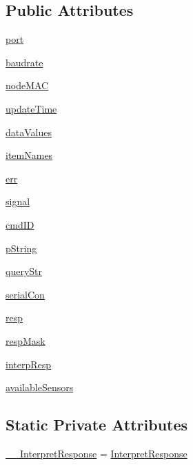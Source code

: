 \subsection*{Public Attributes}
\begin{DoxyCompactItemize}
\item 
\hyperlink{classreadsensor_1_1ReadSensor_aa5479d51839a34226df007973db5b28a}{port}
\item 
\hyperlink{classreadsensor_1_1ReadSensor_a55ad7cd6f26347c571cdc03025d52449}{baudrate}
\item 
\hyperlink{classreadsensor_1_1ReadSensor_aca28301a80b828d13f180b3560acd929}{node\+M\+AC}
\item 
\hyperlink{classreadsensor_1_1ReadSensor_adb42967437e88c29257d8fa7e6dcd8e2}{update\+Time}
\item 
\hyperlink{classreadsensor_1_1ReadSensor_aee72f840d408cc229fe805996b62f0a1}{data\+Values}
\item 
\hyperlink{classreadsensor_1_1ReadSensor_a3a7da988d173549fed3f6c4f8dd48713}{item\+Names}
\item 
\hyperlink{classreadsensor_1_1ReadSensor_abea3837d8a334bcd560117be3468e555}{err}
\item 
\hyperlink{classreadsensor_1_1ReadSensor_a1e626c0e06fbf1b266d9bb39c363196c}{signal}
\item 
\hyperlink{classreadsensor_1_1ReadSensor_a3f1a8b0a95d14b00ceeb4a1d90db4146}{cmd\+ID}
\item 
\hyperlink{classreadsensor_1_1ReadSensor_a260848062ae91ce183d5b8a7bb4336a9}{p\+String}
\item 
\hyperlink{classreadsensor_1_1ReadSensor_ac90ad89a36244ff79ec5de39250dbe65}{query\+Str}
\item 
\hyperlink{classreadsensor_1_1ReadSensor_ab85a47186a692e87ed91dfbd6421ac9f}{serial\+Con}
\item 
\hyperlink{classreadsensor_1_1ReadSensor_a3bfdf8d80b9b2c6e3756546f66684543}{resp}
\item 
\hyperlink{classreadsensor_1_1ReadSensor_a2add837e5b36f9242b3481f30be5ace9}{resp\+Mask}
\item 
\hyperlink{classreadsensor_1_1ReadSensor_aa9c0ba1400248735f49ccf7f4d7fcbec}{interp\+Resp}
\item 
\hyperlink{classreadsensor_1_1ReadSensor_ae04c9a7ad4cb4a0c68225cea810f9edd}{available\+Sensors}
\end{DoxyCompactItemize}
\subsection*{Static Private Attributes}
\begin{DoxyCompactItemize}
\item 
\hyperlink{classreadsensor_1_1ReadSensor_a26862f7f2d34ceb3201cfeb7339dd21b}{\+\_\+\+\_\+\+Interpret\+Response} = \hyperlink{classreadsensor_1_1ReadSensor_af42ab8caf111db6f14d49cbcfad445c3}{Interpret\+Response}
\end{DoxyCompactItemize}


